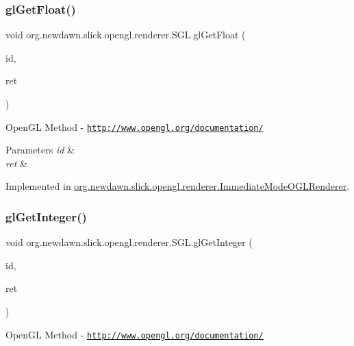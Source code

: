 \subsubsection{\texorpdfstring{gl\+Get\+Float()}{glGetFloat()}}
{\footnotesize\ttfamily void org.\+newdawn.\+slick.\+opengl.\+renderer.\+S\+G\+L.\+gl\+Get\+Float (\begin{DoxyParamCaption}\item[{int}]{id,  }\item[{Float\+Buffer}]{ret }\end{DoxyParamCaption})}

Open\+GL Method -\/  \href{http://www.opengl.org/documentation/}{\tt http\+://www.\+opengl.\+org/documentation/}


\begin{DoxyParams}{Parameters}
{\em id} & \\
\hline
{\em ret} & \\
\hline
\end{DoxyParams}


Implemented in \mbox{\hyperlink{classorg_1_1newdawn_1_1slick_1_1opengl_1_1renderer_1_1_immediate_mode_o_g_l_renderer_a35802bb8ba68a4426b89edb0fd3aaa91}{org.\+newdawn.\+slick.\+opengl.\+renderer.\+Immediate\+Mode\+O\+G\+L\+Renderer}}.

\mbox{\label{interfaceorg_1_1newdawn_1_1slick_1_1opengl_1_1renderer_1_1_s_g_l_ab04cb68029b55582eb4b17b489cbbb2f}} 
\subsubsection{\texorpdfstring{gl\+Get\+Integer()}{glGetInteger()}}
{\footnotesize\ttfamily void org.\+newdawn.\+slick.\+opengl.\+renderer.\+S\+G\+L.\+gl\+Get\+Integer (\begin{DoxyParamCaption}\item[{int}]{id,  }\item[{Int\+Buffer}]{ret }\end{DoxyParamCaption})}

Open\+GL Method -\/  \href{http://www.opengl.org/documentation/}{\tt http\+://www.\+opengl.\+org/documentation/}


